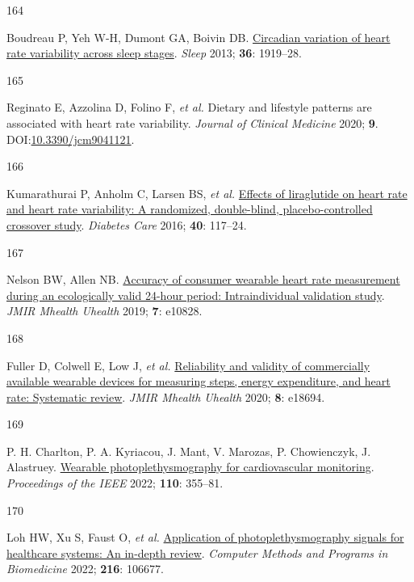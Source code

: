 \documentclass[
  letterpaper,
  headsepline=true,
  open=any]{scrbook}
\newlength{\cslhangindent}
\newlength{\csllabelwidth}
\newlength{\cslentryspacingunit} %
\newenvironment{CSLReferences}[2] %
 {%
  \setlength{\parindent}{0pt}
  \ifodd #1
  \let\oldpar\par
  \def\par{\hangindent=\cslhangindent\oldpar}
  \fi
  \setlength{\parskip}{#2\cslentryspacingunit}
 }%
 {}
\newcommand{\CSLLeftMargin}[1]{\parbox[t]{\csllabelwidth}{#1}}
\newcommand{\CSLRightInline}[1]{\parbox[t]{\linewidth - \csllabelwidth}{#1}\break}
\begin{document}
\begin{CSLReferences}{0}{0}
\leavevmode{}%
\CSLLeftMargin{164 }%
\CSLRightInline{Boudreau P, Yeh W-H, Dumont GA, Boivin DB.
\href{https://doi.org/10.5665/sleep.3230}{Circadian variation of heart
rate variability across sleep stages}. \emph{Sleep} 2013; \textbf{36}:
1919--28.}

\leavevmode{}%
\CSLLeftMargin{165 }%
\CSLRightInline{Reginato E, Azzolina D, Folino F, \emph{et al.} Dietary
and lifestyle patterns are associated with heart rate variability.
\emph{Journal of Clinical Medicine} 2020; \textbf{9}.
DOI:\href{https://doi.org/10.3390/jcm9041121}{10.3390/jcm9041121}.}

\leavevmode{}%
\CSLLeftMargin{166 }%
\CSLRightInline{Kumarathurai P, Anholm C, Larsen BS, \emph{et al.}
\href{https://doi.org/10.2337/dc16-1580}{Effects of liraglutide on heart
rate and heart rate variability: A randomized, double-blind,
placebo-controlled crossover study}. \emph{Diabetes Care} 2016;
\textbf{40}: 117--24.}

\leavevmode{}%
\CSLLeftMargin{167 }%
\CSLRightInline{Nelson BW, Allen NB.
\href{https://doi.org/10.2196/10828}{Accuracy of consumer wearable heart
rate measurement during an ecologically valid 24-hour period:
Intraindividual validation study}. \emph{JMIR Mhealth Uhealth} 2019;
\textbf{7}: e10828.}

\leavevmode{}%
\CSLLeftMargin{168 }%
\CSLRightInline{Fuller D, Colwell E, Low J, \emph{et al.}
\href{https://doi.org/10.2196/18694}{Reliability and validity of
commercially available wearable devices for measuring steps, energy
expenditure, and heart rate: Systematic review}. \emph{JMIR Mhealth
Uhealth} 2020; \textbf{8}: e18694.}

\leavevmode{}%
\CSLLeftMargin{169 }%
\CSLRightInline{P. H. Charlton, P. A. Kyriacou, J. Mant, V. Marozas, P.
Chowienczyk, J. Alastruey.
\href{https://doi.org/10.1109/JPROC.2022.3149785}{Wearable
photoplethysmography for cardiovascular monitoring}. \emph{Proceedings
of the IEEE} 2022; \textbf{110}: 355--81.}

\leavevmode{}%
\CSLLeftMargin{170 }%
\CSLRightInline{Loh HW, Xu S, Faust O, \emph{et al.}
\href{https://doi.org/10.1016/j.cmpb.2022.106677}{Application of
photoplethysmography signals for healthcare systems: An in-depth
review}. \emph{Computer Methods and Programs in Biomedicine} 2022;
\textbf{216}: 106677.}


\end{CSLReferences}
\end{document}
